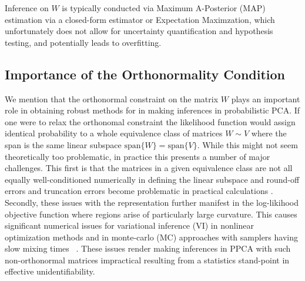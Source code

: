\documentclass{article}
\begin{document}
Inference on $W$ is typically conducted via Maximum A-Posterior (MAP) estimation via a closed-form estimator or Expectation Maximzation\citep[chapt.~12.2]{murphy2012machine}, which unfortunately does not allow for uncertainty quantification and hypothesis testing, and potentially leads to overfitting. 


\subsection{Importance of the Orthonormality Condition}
\label{orthonormal}
We mention that the orthonormal constraint on the matrix $W$ plays an important role in obtaining robust methods for
in making inferences in probabilistic PCA.  If one were to relax the orthonomal constraint the likelihood function would assign identical probability to a whole equivalence class of matrices $W \sim V$ where the span is the same linear subspace $\mbox{span}\{W\} = \mbox{span}\{V\}$.  While this might not seem theoretically too problematic, in practice this presents a number of major challenges.  This first is that the matrices in a given equivalence class are not all equally well-conditioned numerically in defining the linear subspace and round-off errors and truncation errors become problematic in practical calculations .  Secondly, these issues with the representation further manifest in the log-likihood objective function where regions arise of particularly large curvature.  This causes significant numerical issues for variational inference (VI) in nonlinear optimization methods and in monte-carlo (MC) approaches with samplers having slow mixing times~
\citet[chapt.~12.1.3]{murphy2012machine, mohamed2009bayesian,holbrook2016bayesian}.  These issues render making inferences in PPCA with such non-orthonormal matrices impractical resulting from a statistics stand-point in effective unidentifiability.
\end{document}
